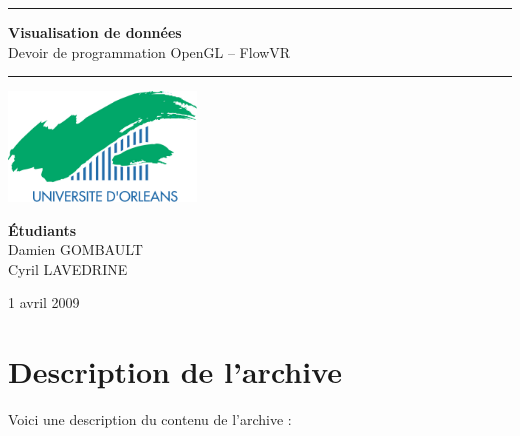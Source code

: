 \documentclass[a4paper, 12pt]{article}
\begin{document}
\thispagestyle{empty}

\begin{center}
\vspace*{\fill}

\hrule
\vspace{1cm}
{\Huge \textbf{Visualisation de données} \\}
{\LARGE Devoir de programmation OpenGL -- FlowVR \\}
\vspace{1cm}
\hrule

\vspace{2cm}
\includegraphics[width=5cm]{include/logos/universite.png}
\vspace{2cm}

{\Large
\textbf{Étudiants} \\
Damien GOMBAULT \\
Cyril LAVEDRINE \\
}

\vspace{4cm}

\large{1\ier{} avril 2009\\}

\vspace*{\fill}
\end{center}

\newpage

\renewcommand{\contentsname}{Sommaire}
\setcounter{tocdepth}{4}
\tableofcontents
\newpage

\section{Description de l'archive}

Voici une description du contenu de l'archive :
\end{document}
